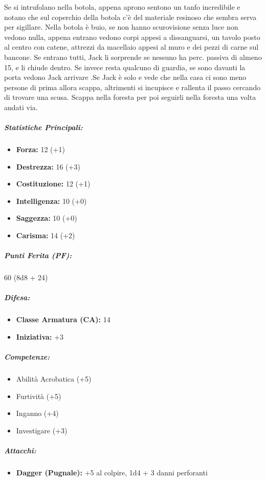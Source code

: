 \documentclass{article}
\begin{document}
 Se si intrufolano nella botola, appena aprono sentono un tanfo incredibile e notano che sul coperchio della botola c'è del materiale resinoso che sembra serva per sigillare. Nella botola è buio, se non hanno scurovisione senza luce non vedono nulla, appena entrano vedono corpi appesi a dissanguarsi, un tavolo posto al centro con catene, attrezzi da macellaio appesi al muro e dei pezzi di carne sul bancone.
  Se entrano tutti, Jack li sorprende se nessuno ha perc. passiva di almeno 15, e li chiude dentro. Se invece resta qualcuno di guardia, se sono davanti la porta vedono Jack arrivare .Se Jack è solo e vede che nella casa ci sono meno persone di prima allora scappa, altrimenti si incupisce e rallenta il passo cercando di trovare una scusa. Scappa nella foresta per poi seguirli nella foresta una volta andati via.   
   

\subparagraph*{Statistiche Principali:}
\begin{itemize}
  \item \textbf{Forza:} 12 (+1)
  \item \textbf{Destrezza:} 16 (+3)
  \item \textbf{Costituzione:} 12 (+1)
  \item \textbf{Intelligenza:} 10 (+0)
  \item \textbf{Saggezza:} 10 (+0)
  \item \textbf{Carisma:} 14 (+2)
\end{itemize}

\subparagraph*{Punti Ferita (PF):}
60 (8d8 + 24)

\subparagraph*{Difesa:}
\begin{itemize}
  \item \textbf{Classe Armatura (CA):} 14
  \item \textbf{Iniziativa:} +3
\end{itemize}

\subparagraph*{Competenze:}
\begin{itemize}
  \item Abilità Acrobatica (+5)
  \item Furtività (+5)
  \item Inganno (+4)
  \item Investigare (+3)
\end{itemize}

\subparagraph*{Attacchi:}
\begin{itemize}
  \item \textbf{Dagger (Pugnale):} +5 al colpire, 1d4 + 3 danni perforanti
\end{itemize}
\end{document}
